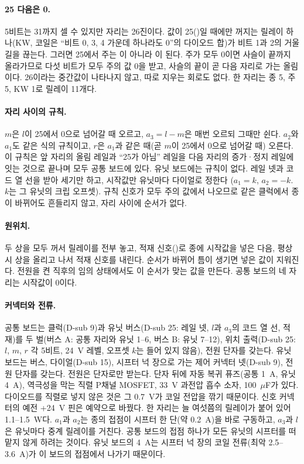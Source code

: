 \paragraph{25 다음은 0.} 5비트는 31까지 셀 수 있지만 자리는 26진이다. 값이 25()일 때에만 꺼지는
릴레이 하나(KW, 코일은 ``비트 0, 3, 4 가운데 하나라도 0''의 다이오드 합)가 비트 1과 2의 거울 길을 끊는다.
그러면 25에서 주는 이 아니라 이 된다. 주가 모두 0이면 사슬이 끝까지 올라가므로 다섯
비트가 모두 주의 값 0을 받고, 사슬의 끝이 곧 다음 자리로 가는 올림이다. 26이라는 중간값이 나타나지 않고,
따로 지우는 회로도 없다. 한 자리는 종 5, 주 5, KW 1로 릴레이 11개다.

\paragraph{자리 사이의 규칙.} $m$은 $l$이 25에서 0으로 넘어갈 때 오르고, $a_3 = l - m$은 매번 오르되 그때만
쉰다. $a_2$와 $a_1$도 같은 식의 규칙이고, $r$은 $a_1$과 같은 때(곧 $m$이 25에서 0으로 넘어갈 때) 오른다. 이 규칙은
앞 자리의 올림 레일과 ``25가 아님'' 레일을 다음 자리의 증가·정지 레일에 잇는 것으로 끝나며 모두 공통 보드에 있다.
유닛 보드에는 규칙이 없다. 레일 넷과 코드 열 선을 받아 세기만 하고, 시작값만 유닛마다 다이얼로 정한다
($a_1 = k$, $a_2 = -k$. $k$는 그 유닛의 크립 오프셋). 규칙 신호가 모두 주의 값에서 나오므로 같은 클럭에서 종이
바뀌어도 흔들리지 않고, 자리 사이에 순서가 없다.

\paragraph{원위치.} 두 상을 모두 꺼서 릴레이를 전부 놓고, 적재 신호()로 종에 시작값을 넣은 다음,
평상시 상을 올리고 나서 적재 신호를 내린다. 순서가 바뀌어 틈이 생기면 넣은 값이 지워진다. 전원을 켠 직후의
임의 상태에서도 이 순서가 맞는 값을 만든다. 공통 보드의 네 자리는 시작값이 0이다.

\paragraph{커넥터와 전류.} 공통 보드는 클럭(D-sub 9)과 유닛 버스(D-sub 25: 레일 넷, $l$과 $a_3$의 코드 열 선,
적재)를 두 벌(버스 A: 공통 자리와 유닛 1--6, 버스 B: 유닛 7--12), 위치 출력(D-sub 25: $l$, $m$, $r$ 각 5비트, 24~V 레벨, 오프셋 $k$는 들어 있지 않음), 전원 단자를 갖는다.
유닛 보드는 버스, 다이얼(D-sub 15), 시프터 넉 장으로 가는 제어 커넥터 넷(D-sub 9), 전원 단자를 갖는다. 전원은
단자로만 받는다. 단자 뒤에 자동 복귀 퓨즈(공통 1~A, 유닛 4~A), 역극성을 막는 직렬 P채널 MOSFET, 33~V 과전압
흡수 소자, 100~$\mu$F가 있다. 다이오드를 직렬로 넣지 않은 것은 그 0.7~V가 코일 전압을 깎기 때문이다. 신호
커넥터의 예전 +24~V 핀은 예약으로 바꿨다. 한 자리는 늘 여섯쯤의 릴레이가 붙어 있어 1.1--1.5~W다. $a_1$과
$a_2$는 종의 접점이 시프터 한 단(약 0.2~A)을 바로 구동하고, $a_3$과 $l$은 유닛마다 중계 릴레이를 거친다. 공통
보드의 접점 하나가 모든 유닛의 시프터를 떠맡지 않게 하려는 것이다. 유닛 보드의 4~A는 시프터 넉 장의 코일
전류(최악 2.5--3.6~A)가 이 보드의 접점에서 나가기 때문이다.

